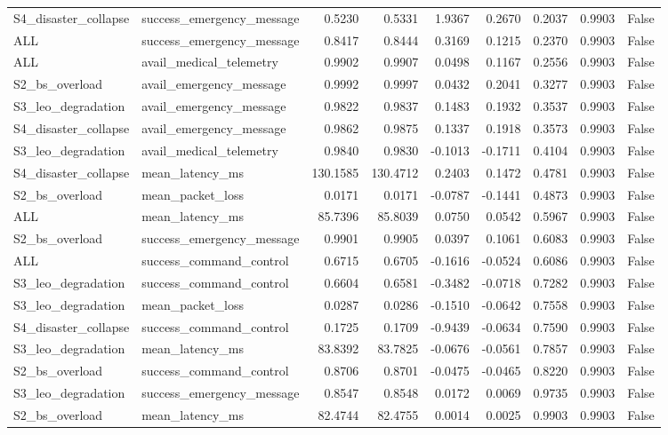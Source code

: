 \begin{tabular}{llrrrrrrr}
S4\_disaster\_collapse & success\_emergency\_message & 0.5230 & 0.5331 & 1.9367 & 0.2670 & 0.2037 & 0.9903 & False \\
ALL & success\_emergency\_message & 0.8417 & 0.8444 & 0.3169 & 0.1215 & 0.2370 & 0.9903 & False \\
ALL & avail\_medical\_telemetry & 0.9902 & 0.9907 & 0.0498 & 0.1167 & 0.2556 & 0.9903 & False \\
S2\_bs\_overload & avail\_emergency\_message & 0.9992 & 0.9997 & 0.0432 & 0.2041 & 0.3277 & 0.9903 & False \\
S3\_leo\_degradation & avail\_emergency\_message & 0.9822 & 0.9837 & 0.1483 & 0.1932 & 0.3537 & 0.9903 & False \\
S4\_disaster\_collapse & avail\_emergency\_message & 0.9862 & 0.9875 & 0.1337 & 0.1918 & 0.3573 & 0.9903 & False \\
S3\_leo\_degradation & avail\_medical\_telemetry & 0.9840 & 0.9830 & -0.1013 & -0.1711 & 0.4104 & 0.9903 & False \\
S4\_disaster\_collapse & mean\_latency\_ms & 130.1585 & 130.4712 & 0.2403 & 0.1472 & 0.4781 & 0.9903 & False \\
S2\_bs\_overload & mean\_packet\_loss & 0.0171 & 0.0171 & -0.0787 & -0.1441 & 0.4873 & 0.9903 & False \\
ALL & mean\_latency\_ms & 85.7396 & 85.8039 & 0.0750 & 0.0542 & 0.5967 & 0.9903 & False \\
S2\_bs\_overload & success\_emergency\_message & 0.9901 & 0.9905 & 0.0397 & 0.1061 & 0.6083 & 0.9903 & False \\
ALL & success\_command\_control & 0.6715 & 0.6705 & -0.1616 & -0.0524 & 0.6086 & 0.9903 & False \\
S3\_leo\_degradation & success\_command\_control & 0.6604 & 0.6581 & -0.3482 & -0.0718 & 0.7282 & 0.9903 & False \\
S3\_leo\_degradation & mean\_packet\_loss & 0.0287 & 0.0286 & -0.1510 & -0.0642 & 0.7558 & 0.9903 & False \\
S4\_disaster\_collapse & success\_command\_control & 0.1725 & 0.1709 & -0.9439 & -0.0634 & 0.7590 & 0.9903 & False \\
S3\_leo\_degradation & mean\_latency\_ms & 83.8392 & 83.7825 & -0.0676 & -0.0561 & 0.7857 & 0.9903 & False \\
S2\_bs\_overload & success\_command\_control & 0.8706 & 0.8701 & -0.0475 & -0.0465 & 0.8220 & 0.9903 & False \\
S3\_leo\_degradation & success\_emergency\_message & 0.8547 & 0.8548 & 0.0172 & 0.0069 & 0.9735 & 0.9903 & False \\
S2\_bs\_overload & mean\_latency\_ms & 82.4744 & 82.4755 & 0.0014 & 0.0025 & 0.9903 & 0.9903 & False \\
\bottomrule
\end{tabular}
